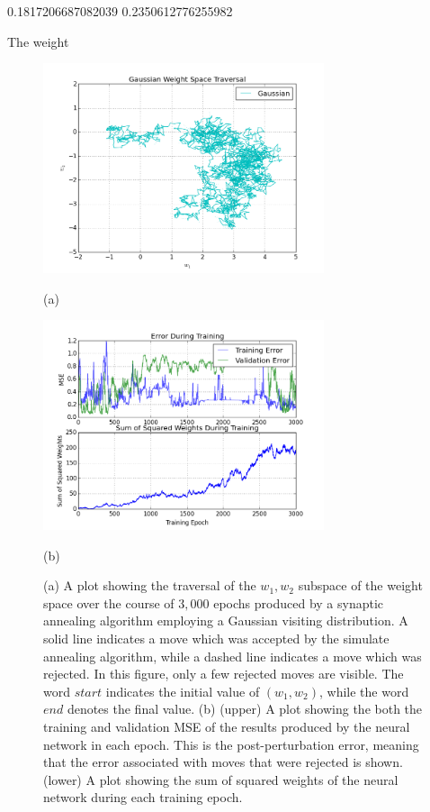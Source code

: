 \documentclass[11pt]{afthesis}
\begin{document}
	0.1817206687082039 0.2350612776255982
	
	The weight 
 	\begin{figure}[ht!]
 		
 		\begin{minipage}[b]{0.5\linewidth}
 			\centering
 			\centerline{\includegraphics[width = 3.25in]{figures/weight_space_gaussian.png}}
 			\centerline{(a)}\medskip
 		\end{minipage}
 		\hfill
 		\begin{minipage}[b]{0.5\linewidth}
 			\centering
 			\centerline{\includegraphics[width = 3.25in]{figures/weight_space_gaussian_perf.png}}
 			\centerline{(b)}\medskip
 		\end{minipage}
 		\caption{
 			(a) A plot showing the traversal of the $w_1,w_2$ subspace of the weight space over the course of $3,000$ epochs produced by a synaptic annealing algorithm employing a Gaussian visiting distribution. A solid line indicates a move which was accepted by the simulate annealing algorithm, while a dashed line indicates a move which was rejected. In this figure, only a few rejected moves are visible. The word $start$ indicates the initial value of $(w_1,w_2)$, while the word $end$ denotes the final value. 
 			(b) (upper) A plot showing the both the training and validation MSE of the results produced by the neural network in each epoch. This is the post-perturbation error, meaning that the error associated with moves that were rejected is shown. (lower) A plot showing the sum of squared weights of the neural network during each training epoch.}
 		\label{fig:weight_space_gaussian}
 		
 	\end{figure}
	 
\end{document}
